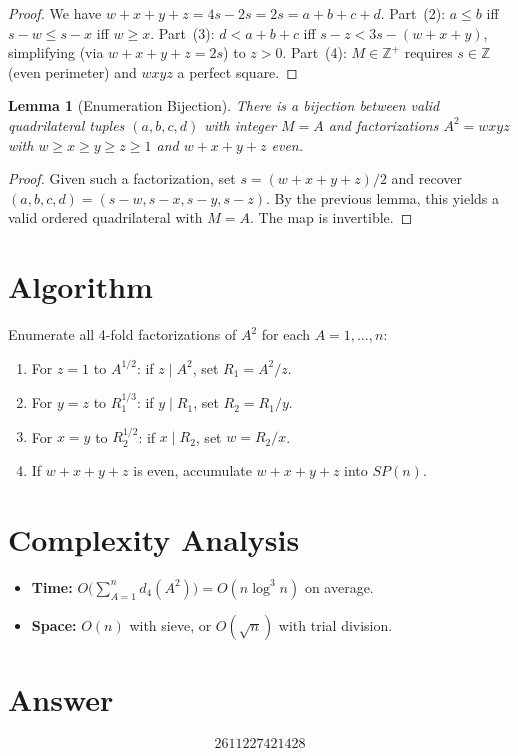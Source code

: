 \documentclass[11pt]{article}
\newtheorem{lemma}[theorem]{Lemma}
\begin{document}
\begin{proof}
We have $w+x+y+z = 4s - 2s = 2s = a+b+c+d$. Part~(2): $a \le b$ iff $s-w \le s-x$ iff $w \ge x$. Part~(3): $d < a+b+c$ iff $s-z < 3s-(w+x+y)$, simplifying (via $w+x+y+z=2s$) to $z > 0$. Part~(4): $M \in \mathbb{Z}^+$ requires $s \in \mathbb{Z}$ (even perimeter) and $wxyz$ a perfect square.
\end{proof}

\begin{lemma}[Enumeration Bijection]
There is a bijection between valid quadrilateral tuples $(a,b,c,d)$ with integer $M = A$ and factorizations $A^2 = wxyz$ with $w \ge x \ge y \ge z \ge 1$ and $w+x+y+z$ even.
\end{lemma}

\begin{proof}
Given such a factorization, set $s=(w+x+y+z)/2$ and recover $(a,b,c,d)=(s-w,s-x,s-y,s-z)$. By the previous lemma, this yields a valid ordered quadrilateral with $M=A$. The map is invertible.
\end{proof}

\section{Algorithm}

Enumerate all 4-fold factorizations of $A^2$ for each $A = 1,\ldots,n$:
\begin{enumerate}
  \item For $z = 1$ to $A^{1/2}$: if $z \mid A^2$, set $R_1 = A^2/z$.
  \item For $y = z$ to $R_1^{1/3}$: if $y \mid R_1$, set $R_2 = R_1/y$.
  \item For $x = y$ to $R_2^{1/2}$: if $x \mid R_2$, set $w = R_2/x$.
  \item If $w+x+y+z$ is even, accumulate $w+x+y+z$ into $SP(n)$.
\end{enumerate}

\section{Complexity Analysis}

\begin{itemize}
  \item \textbf{Time:} $O\bigl(\sum_{A=1}^{n} d_4(A^2)\bigr) = O(n\log^3 n)$ on average.
  \item \textbf{Space:} $O(n)$ with sieve, or $O(\sqrt{n})$ with trial division.
\end{itemize}

\section{Answer}

\[
\boxed{2611227421428}
\]
\end{document}
